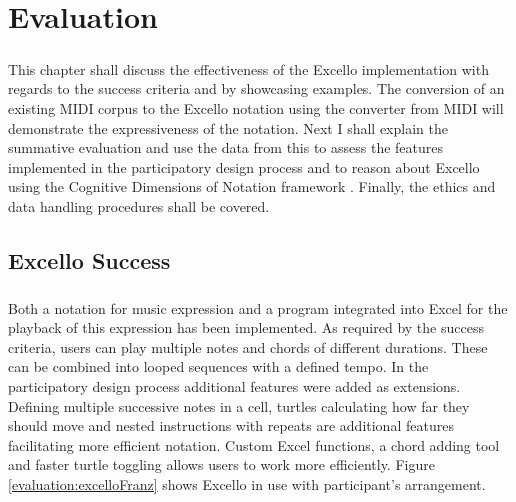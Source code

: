 
\newcommand{\mycbox}[1]{\tikz{\path[draw=#1,fill=#1] (0,0) rectangle (0.3cm,0.3cm);}}

\chapter{Evaluation}

\paragraph{} This chapter shall discuss the effectiveness of the Excello implementation with regards to the success criteria and by showcasing examples. The conversion of an existing MIDI corpus to the Excello notation using the converter from MIDI will demonstrate the expressiveness of the notation. Next I shall explain the summative evaluation and use the data from this to assess the features implemented in the participatory design process and to reason about Excello using the Cognitive Dimensions of Notation framework \cite{blackwell:tutorial}. Finally, the ethics and data handling procedures shall be covered.

\section{Excello Success}

\paragraph{} Both a notation for music expression and a program integrated into Excel for the playback of this expression has been implemented. As required by the success criteria, users can play multiple notes and chords of different durations. These can be combined into looped sequences with a defined tempo. In the participatory design process additional features were added as extensions. Defining multiple successive notes in a cell, turtles calculating how far they should move and nested instructions with repeats are additional features facilitating more efficient notation. Custom Excel functions, a chord adding tool and faster turtle toggling allows users to work more efficiently. Figure \ref{evaluation:excelloFranz} shows Excello in use with participant's arrangement.

